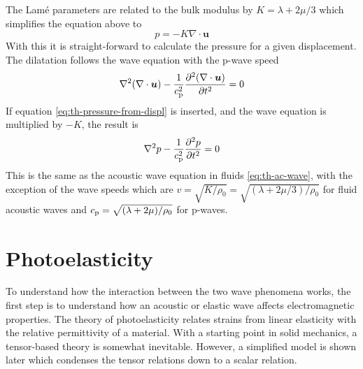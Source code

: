 \documentclass[11pt,twoside]{eitExjobb}
\begin{document}
	The Lamé parameters are related to the bulk modulus by $K = \lambda + 2\mu/3$ \cite{Irgens2008} which simplifies the equation above to
	\begin{equation}
		p = -K \nabla \cdot \bm{u}
		\label{eq:th-pressure-from-displ}
	\end{equation}
	With this it is straight-forward to calculate the pressure for a given displacement. The dilatation follows the wave equation with the p-wave speed \cite{Schmerr2016}
	\begin{equation*}
		\nabla^2 (\nabla \cdot \bm{u}) - \frac{1}{c_{\mathrm{p}}^2} \frac{\partial^2 (\nabla \cdot \bm{u})}{\partial t^2} = 0
	\end{equation*}
	If equation \eqref{eq:th-pressure-from-displ} is inserted, and the wave equation is multiplied by $-K$, the result is
	\begin{equation*}
		\nabla^2 p - \frac{1}{c_{\mathrm{p}}^2} \frac{\partial^2 p}{\partial t^2} = 0
	\end{equation*}
	This is the same as the acoustic wave equation in fluids \eqref{eq:th-ac-wave}, with the exception of the wave speeds which are $v = \sqrt{K/\rho_0} = \sqrt{(\lambda + 2\mu/3)/\rho_0}$ for fluid acoustic waves and $c_{\mathrm{p}} = \sqrt{(\lambda + 2\mu)/\rho_0}$ for p-waves.
	
	
	\section{Photoelasticity}
	To understand how the interaction between the two wave phenomena works, the first step is to understand how an acoustic or elastic wave affects electromagnetic properties. The theory of photoelasticity relates strains from linear elasticity with the relative permittivity of a material. With a starting point in solid mechanics, a tensor-based theory is somewhat inevitable. However, a simplified model is shown later which condenses the tensor relations down to a scalar relation.
	
\end{document}

